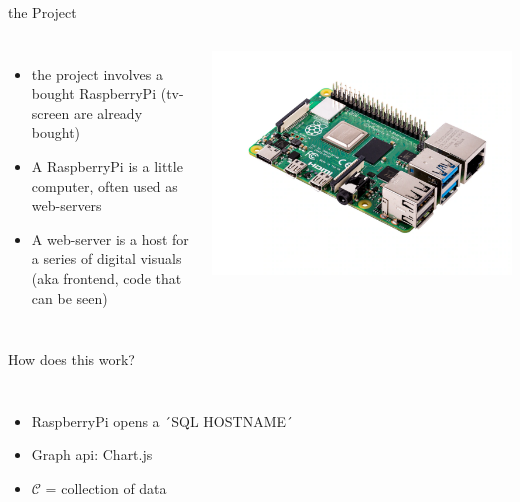 \documentclass[aspectratio=169,handout]{beamer}
\begin{document}
\begin{frame}{the Project}
\begin{columns}
\begin{itemize}
\item the project involves a bought RaspberryPi (tv-screen are already bought)
\item A RaspberryPi is a little computer, often used as web-servers
\item A web-server is a host for a series of digital visuals (aka frontend, code that can be seen)
\end{itemize}
\centering
\includegraphics[width=\textwidth]{./image.png}
\end{columns}
\end{frame}
\begin{frame}{How does this work?}
\begin{columns}
\begin{itemize}
    \item RaspberryPi opens a ´SQL HOSTNAME´
    \item Graph api: Chart.js
    \item $\mathcal{C}$ = collection of data
\end{itemize}
\centering

\end{columns}
\end{frame}
\end{document}
